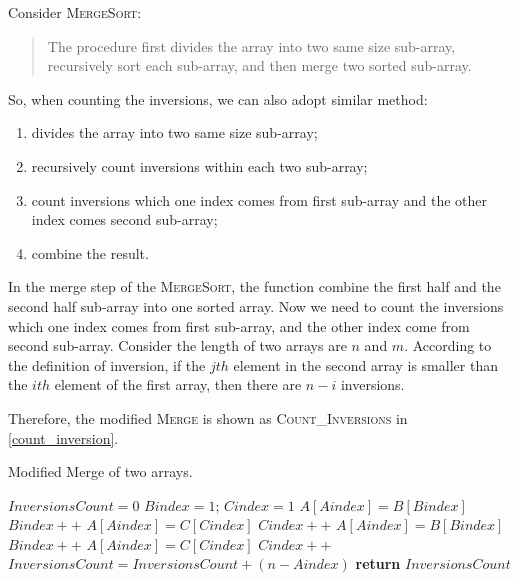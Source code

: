 \begin{homeworkProblem}[Inversions]

Consider \textsc{MergeSort}:

\begin{quote}
    The procedure first divides the array into two same size sub-array, recursively
    sort each sub-array, and then merge two sorted sub-array.
\end{quote}

So, when counting the inversions, we can also adopt similar method:
\begin{enumerate}
\item divides the array into two same size sub-array;
\item recursively count inversions within each two sub-array;
\item count inversions which one index comes from first sub-array and the other index comes
second sub-array;
\item combine the result.
\end{enumerate}

In the merge step of the \textsc{MergeSort}, the function combine the first half
and the second half sub-array into one sorted array. Now we need to count the
inversions which one index comes from first sub-array, and the other index come
from second sub-array. Consider the length of two arrays are $n$ and $m$.
According to the definition of inversion, if the $jth$ element in the second
array is smaller than the $ith$ element of the first array, then there are $n - i$
inversions.

Therefore, the modified \textsc{Merge} is shown as \textsc{Count\_Inversions} in \cref{count_inversion}.

\begin{algorithm}[H]
    \caption{Modified Merge of two arrays.} \label{count_inversion}
    \begin{algorithmic}[1]
        \State$InversionsCount = 0$
        \State$Bindex = 1$; $Cindex = 1$
             
                \State $A[Aindex]= B[Bindex]$
                \State $Bindex++$
             
                \State $A[Aindex] = C[Cindex]$
                \State $Cindex++$
             
                \State $A[Aindex] = B[Bindex]$
                \State $Bindex++$
            \Else {}
                \State $A[Aindex] = C[Cindex]$
                \State $Cindex++$
                \State $InversionsCount = InversionsCount + (n - Aindex)$
            \EndIf
        \EndFor
        \State \textbf{return } $InversionsCount$
        \EndProcedure
    \end{algorithmic}
\end{algorithm}


\end{homeworkProblem}

